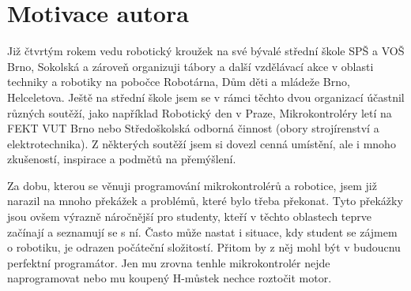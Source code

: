  
\addtocounter{footnote}{-1} %



%

\section{Motivace autora}

Již čtvrtým rokem vedu robotický kroužek na své bývalé střední škole SPŠ a VOŠ Brno, Sokolská a zároveň organizuji tábory a další vzdělávací akce v oblasti techniky a robotiky na pobočce Robotárna, Dům děti a mládeže Brno, Helceletova.
Ještě na střední škole jsem se v rámci těchto dvou organizací účastnil různých soutěží, jako například Robotický den v Praze, Mikrokontroléry letí na FEKT VUT Brno nebo Středoškolská odborná činnost (obory strojírenství a elektrotechnika). 
Z některých soutěží jsem si dovezl cenná umístění, ale i mnoho zkušeností, inspirace a podmětů na přemýšlení.

Za dobu, kterou se věnuji programování mikrokontrolérů a robotice, jsem již narazil na mnoho překážek a problémů, které bylo třeba překonat. 
Tyto překážky jsou ovšem výrazně náročnější pro studenty, kteří v těchto oblastech teprve začínají a seznamují se s ní. 
Často může nastat i situace, kdy student se zájmem o robotiku, je odrazen počáteční složitostí. 
Přitom by z něj mohl být v budoucnu perfektní programátor. 
Jen mu zrovna tenhle mikrokontrolér nejde naprogramovat nebo mu koupený H-můstek nechce roztočit motor.

